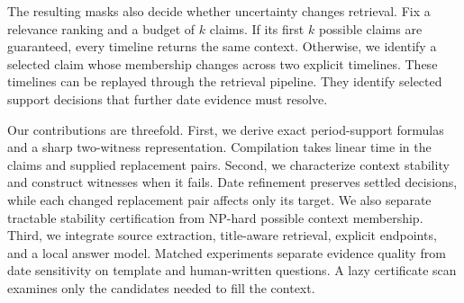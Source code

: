 The resulting masks also decide whether uncertainty changes retrieval.
Fix a relevance ranking and a budget of $k$ claims.
If its first $k$ possible claims are guaranteed, every timeline returns the same context.
Otherwise, we identify a selected claim whose membership changes across two explicit timelines.
These timelines can be replayed through the retrieval pipeline.
They identify selected support decisions that further date evidence must resolve.

Our contributions are threefold.
First, we derive exact period-support formulas and a sharp two-witness representation.
Compilation takes linear time in the claims and supplied replacement pairs.
Second, we characterize context stability and construct witnesses when it fails.
Date refinement preserves settled decisions, while each changed replacement pair affects only its target.
We also separate tractable stability certification from NP-hard possible context membership.
Third, we integrate source extraction, title-aware retrieval, explicit endpoints, and a local answer model.
Matched experiments separate evidence quality from date sensitivity on template and human-written questions.
A lazy certificate scan examines only the candidates needed to fill the context.
